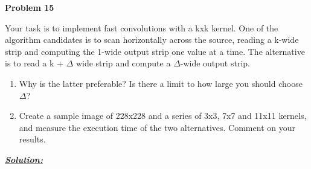 \documentclass{article}
\begin{document}
\newpage
\noindent \textbf{Problem 15}

Your task is to implement fast convolutions with a kxk kernel. One of the algorithm
candidates is to scan horizontally across the source, reading a k-wide strip and computing
the 1-wide output strip one value at a time. The alternative is to read a k + $\Delta$ wide strip
and compute a $\Delta$-wide output strip.
\begin{enumerate} [label=\Alph*]
    \item Why is the latter preferable? Is there a limit to how large you should choose $\Delta$?
    \item Create a sample image of 228x228 and a series of 3x3, 7x7 and 11x11 kernels, and
measure the execution time of the two alternatives. Comment on your results.

\end{enumerate}

\noindent \underline{\textbf{\textit{Solution:}}} \\ 
\end{document}
